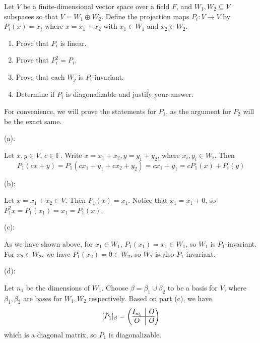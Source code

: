 \documentclass{eh-homework}
\begin{document}
    \begin{question}{8}
    Let $V$ be a finite-dimensional vector space over a field $F$, and $W_1, W_2 \subseteq V$ subspaces so that $V = W_1 \oplus W_2$. Define the projection maps $P_i : V \to V$ by $P_i(x) = x_i$ where $x = x_1 + x_2$ with $x_1 \in W_1$ and $x_2 \in W_2$.
    
    \begin{enumerate}[label=(\alph*)]
        \item Prove that $P_i$ is linear.
        \item Prove that $P_i^2 = P_i$.
        \item Prove that each $W_j$ is $P_i$-invariant.
        \item Determine if $P_i$ is diagonalizable and justify your answer.
    \end{enumerate}
    \tcblower
    For convenience, we will prove the statements for \(P_1\), as the argument for \(P_2\) will be the exact same.

    (a):

    Let \(x,y \in V\), \(c \in \mathbb{F}\). Write \(x = x_1 + x_2, y = y_1 + y_2\), where \(x_i,y_i \in W_i\). Then
    \[
        P_1(cx + y) = P_1(cx_1 + y_1 + cx_2 + y_2) = cx_1 + y_1 = cP_1(x) +P_i(y)
    \]

    \bigskip

    (b):

    Let \(x = x_1 + x_2 \in V\). Then \(P_1(x) = x_1\). Notice that \(x_1 = x_1 + 0\), so \(P_1^2 x = P_1(x_1) = x_1 = P_1(x)\).

    \bigskip

    (c):

    As we have shown above, for \(x_1 \in W_1\), \(P_1(x_1) = x_1 \in W_1\), so \(W_1\) is \(P_1\)-invariant. For \(x_2 \in W_2\), we have \(P_1(x_2) = 0 \in W_2\), so \(W_2\) is also \(P_1\)-invariant.

    \bigskip

    (d):

    Let \(n_1\) be the dimensions of \(W_1\). Choose \(\beta = \beta _1 \cup \beta _2\) to be a basis for \(V\), where \(\beta _1, \beta _2\) are bases for \(W_1, W_2\) respectively. Based on part (c), we have
    \[
        [P_1]_\beta = \left( \begin{array}{@{}c|c@{}}
            I_{n_1} & O \\
            \hline
            O & O
        \end{array} \right) 
    \]
    which is a diagonal matrix, so \(P_1\) is diagonalizable.
    \end{question}
\end{document}
